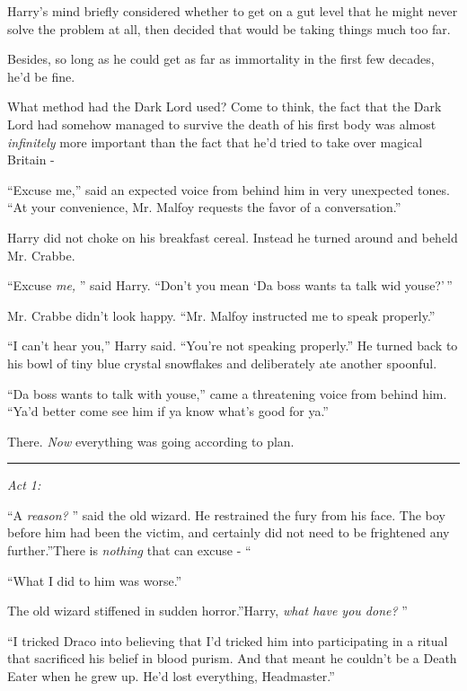 Harry's mind briefly considered whether to get on a gut level that he
might never solve the problem at all, then decided that would be taking
things much too far.

Besides, so long as he could get as far as immortality in the first few
decades, he'd be fine.

What method had the Dark Lord used? Come to think, the fact that the
Dark Lord had somehow managed to survive the death of his first body was
almost \emph{infinitely} more important than the fact that he'd tried to
take over magical Britain -

``Excuse me,'' said an expected voice from behind him in very unexpected
tones. ``At your convenience, Mr. Malfoy requests the favor of a
conversation.''

Harry did not choke on his breakfast cereal. Instead he turned around
and beheld Mr. Crabbe.

``Excuse \emph{me,} '' said Harry. ``Don't you mean `Da boss wants ta talk
wid youse?'\,''

Mr. Crabbe didn't look happy. ``Mr. Malfoy instructed me to speak
properly.''

``I can't hear you,'' Harry said. ``You're not speaking properly.'' He
turned back to his bowl of tiny blue crystal snowflakes and deliberately
ate another spoonful.

``Da boss wants to talk with youse,'' came a threatening voice from
behind him. ``Ya'd better come see him if ya know what's good for ya.''

There. \emph{Now} everything was going according to plan.

\begin{center}\rule{3in}{0.4pt}\end{center}

\emph{Act 1:}

``A \emph{reason?} '' said the old wizard. He restrained the fury from his
face. The boy before him had been the victim, and certainly did not need
to be frightened any further.''There is \emph{nothing} that can excuse -
``

``What I did to him was worse.''

The old wizard stiffened in sudden horror.''Harry, \emph{what have you
done?} ''

``I tricked Draco into believing that I'd tricked him into participating
in a ritual that sacrificed his belief in blood purism. And that meant
he couldn't be a Death Eater when he grew up. He'd lost everything,
Headmaster.''

